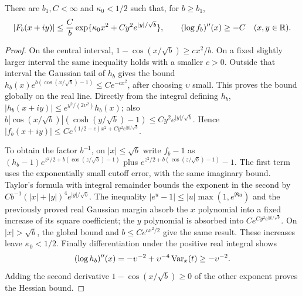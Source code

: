 \begin{lemma}\label{xyh:branch-bounds}
There are $b_1,C<\infty$ and $\kappa_0<1/2$ such that, for $b\ge b_1$,
\begin{equation}\label{xyh:primitive-bound}
 |F_b(x+iy)|\le \frac Cb
  \exp\{\kappa_0 x^2+C y^2 e^{|y|/\sqrt b}\},
 \qquad (\log f_b)''(x)\ge-C\quad(x,y\in\mathbb R).
\end{equation}
\end{lemma}
\begin{proof}
On the central interval, $1-\cos(x/\sqrt b)\ge c x^2/b$.
On a fixed slightly larger interval the same inequality holds with a smaller
$c>0$. Outside that interval the Gaussian tail of $h_b$ gives the bound
$h_b(x)e^{b(\cos(x/\sqrt b)-1)}\le C e^{-c x^2}$, after choosing
$\upsilon$ small. This proves the bound globally on the real line. Directly
from the integral defining $h_b$,
$|h_b(x+iy)|\le e^{y^2/(2\upsilon^2)}h_b(x)$; also
$b|\cos(x/\sqrt b)|(\cosh(y/\sqrt b)-1)
\le C y^2 e^{|y|/\sqrt b}$. Hence
$|f_b(x+iy)|\le C e^{(1/2-c)x^2+C y^2 e^{|y|/\sqrt b}}$.

To obtain the factor $b^{-1}$, on $|x|\le\sqrt b$ write $f_b-1$ as
$(h_b-1)e^{z^2/2+b(\cos(z/\sqrt b)-1)}$
plus $e^{z^2/2+b(\cos(z/\sqrt b)-1)}-1$.
The first term uses the exponentially small cutoff error, with the same
imaginary bound. Taylor's formula with integral remainder bounds the
exponent in the second by
$Cb^{-1}(|x|+|y|)^4e^{|y|/\sqrt b}$.
The inequality $|e^u-1|\le |u|\max(1,e^{\Re u})$ and the previously
proved real Gaussian margin absorb the $x$ polynomial into a fixed
increase of its square coefficient; the $y$ polynomial is absorbed into
$C e^{C y^2e^{|y|/\sqrt b}}$. On $|x|>\sqrt b$, the global bound
and $b\le C e^{c x^2/2}$ give the same result. These increases leave
$\kappa_0<1/2$. Finally differentiation under the positive real integral
shows
\[
 (\log h_b)''(x)=-\upsilon^{-2}
 +\upsilon^{-4}\operatorname{Var}_x(t)\ge-\upsilon^{-2}.
\]
Adding the second derivative $1-\cos(x/\sqrt b)\ge0$ of the other
exponent proves the Hessian bound.
\end{proof}

